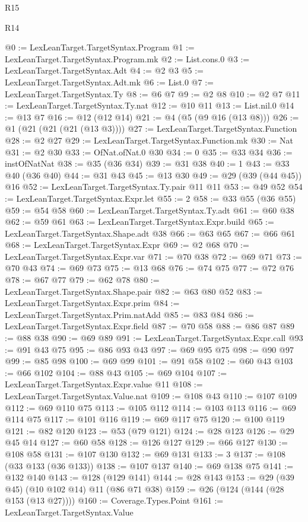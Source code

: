 \begin{lexlean}{R15}
\begin{lexlean}{R14}
\begin{coremodule}
{{{{{{{{{{{{@0 := LexLeanTarget.TargetSyntax.Program
@1 := LexLeanTarget.TargetSyntax.Program.mk
@2 := List.cons.{0}
@3 := LexLeanTarget.TargetSyntax.Adt
@4 := @2 @3
@5 := LexLeanTarget.TargetSyntax.Adt.mk
@6 := List.{0}
@7 := LexLeanTarget.TargetSyntax.Ty
@8 := @6 @7
@9 := @2 @8
@10 := @2 @7
@11 := LexLeanTarget.TargetSyntax.Ty.nat
@12 := @10 @11
@13 := List.nil.{0}
@14 := @13 @7
@16 := @12 (@12 @14)
@21 := @4 (@5 (@9 @16 (@13 @8)))
@26 := @1 (@21 (@21 (@21 (@13 @3))))
@27 := LexLeanTarget.TargetSyntax.Function
@28 := @2 @27
@29 := LexLeanTarget.TargetSyntax.Function.mk
@30 := Nat
@31 := @2 @30
@33 := OfNat.ofNat.{0} @30
@34 := 0
@35 := @33 @34
@36 := instOfNatNat
@38 := @35 (@36 @34)
@39 := @31 @38
@40 := 1
@43 := @33 @40 (@36 @40)
@44 := @31 @43
@45 := @13 @30
@49 := @29 (@39 (@44 @45)) @16
@52 := LexLeanTarget.TargetSyntax.Ty.pair @11 @11
@53 := @49 @52
@54 := LexLeanTarget.TargetSyntax.Expr.let
@55 := 2
@58 := @33 @55 (@36 @55)
@59 := @54 @58
@60 := LexLeanTarget.TargetSyntax.Ty.adt
@61 := @60 @38
@62 := @59 @61
@63 := LexLeanTarget.TargetSyntax.Expr.build
@65 := LexLeanTarget.TargetSyntax.Shape.adt @38
@66 := @63 @65
@67 := @66 @61
@68 := LexLeanTarget.TargetSyntax.Expr
@69 := @2 @68
@70 := LexLeanTarget.TargetSyntax.Expr.var
@71 := @70 @38
@72 := @69 @71
@73 := @70 @43
@74 := @69 @73
@75 := @13 @68
@76 := @74 @75
@77 := @72 @76
@78 := @67 @77
@79 := @62 @78
@80 := LexLeanTarget.TargetSyntax.Shape.pair
@82 := @63 @80 @52
@83 := LexLeanTarget.TargetSyntax.Expr.prim
@84 := LexLeanTarget.TargetSyntax.Prim.natAdd
@85 := @83 @84
@86 := LexLeanTarget.TargetSyntax.Expr.field
@87 := @70 @58
@88 := @86 @87
@89 := @88 @38
@90 := @69 @89
@91 := LexLeanTarget.TargetSyntax.Expr.call
@93 := @91 @43 @75
@95 := @86 @93 @43
@97 := @69 @95 @75
@98 := @90 @97
@99 := @85 @98
@100 := @69 @99
@101 := @91 @58
@102 := @60 @43
@103 := @66 @102
@104 := @88 @43
@105 := @69 @104
@107 := LexLeanTarget.TargetSyntax.Expr.value @11
@108 := LexLeanTarget.TargetSyntax.Value.nat
@109 := @108 @43
@110 := @107 @109
@112 := @69 @110 @75
@113 := @105 @112
@114 := @103 @113
@116 := @69 @114 @75
@117 := @101 @116
@119 := @69 @117 @75
@120 := @100 @119
@121 := @82 @120
@123 := @53 (@79 @121)
@124 := @28 @123
@126 := @29 @45 @14
@127 := @60 @58
@128 := @126 @127
@129 := @66 @127
@130 := @108 @58
@131 := @107 @130
@132 := @69 @131
@133 := 3
@137 := @108 (@33 @133 (@36 @133))
@138 := @107 @137
@140 := @69 @138 @75
@141 := @132 @140
@143 := @128 (@129 @141)
@144 := @28 @143
@153 := @29 (@39 @45) (@10 @102 @14) @11 (@86 @71 @38)
@159 := @26 (@124 (@144 (@28 @153 (@13 @27))))
@160 := Coverage.Types.Point
@161 := LexLeanTarget.TargetSyntax.Value
}}}}}}}}}}}}
\end{coremodule}
\end{lexlean}
\end{lexlean}
